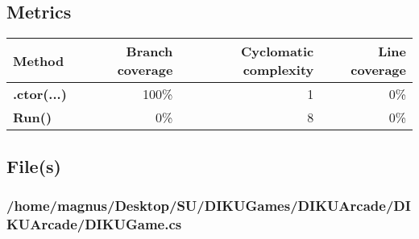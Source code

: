 \documentclass[a4paper,landscape,10pt]{article}
\begin{document}
\subsection{Metrics}
\begin{longtable}[l]{|l|r|r|r|}
\hline
\textbf{Method} & \textbf{Branch coverage} & \textbf{Cyclomatic complexity} & \textbf{Line coverage}\\
\hline
\textbf{.ctor(...)} & 100\% & 1 & 0\%\\
\hline
\textbf{Run()} & 0\% & 8 & 0\%\\
\hline
\end{longtable}
\subsection{File(s)}
\subsubsection{/home/magnus/Desktop/SU/DIKUGames/DIKUArcade/DIKUArcade/DIKUGame.cs}
\end{document}
